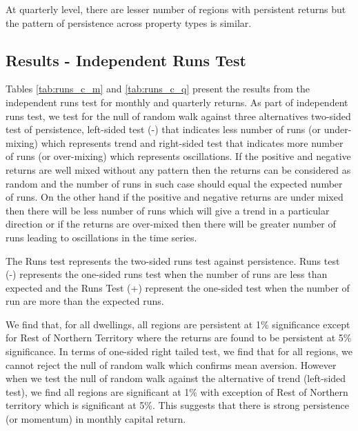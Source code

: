 \documentclass[AEJ,reqno, draftmode]{AEA}
\begin{document}
At quarterly level, there are lesser number of regions with persistent returns but the pattern of persistence across property types is similar.


\restoregeometry


\restoregeometry


\subsection{Results - Independent Runs Test}

Tables \ref{tab:runs_c_m} and \ref{tab:runs_c_q} present the results from the independent runs test for monthly and quarterly returns. As part of independent runs test, we test for the null of random walk against three alternatives two-sided test of persistence, left-sided test (-) that indicates less number of runs (or under-mixing) which represents trend and right-sided test that indicates more number of runs (or over-mixing) which represents oscillations. If the positive and negative returns are well mixed without any pattern then the returns can be considered as random and the number of runs in such case should equal the expected number of runs. On the other hand if the positive and negative returns are under mixed then there will be less number of runs which will give a trend in a particular direction or if the returns are over-mixed then there will be greater number of runs leading to oscillations in the time series. 

The Runs test represents the two-sided runs test against persistence. Runs test (-) represents the one-sided runs test when the number of runs are less than expected and the Runs Test (+) represent the one-sided test when the number of run are more than the expected runs.

We find that, for all dwellings, all regions are persistent at 1\% significance except for Rest of Northern Territory where the returns are found to be persistent at 5\% significance. In terms of one-sided right tailed test, we find that for all regions, we cannot reject the null of random walk which confirms mean aversion. However when we test the null of random walk against the alternative of trend (left-sided test), we find all regions are significant at 1\% with exception of Rest of Northern territory which is significant at 5\%. This suggests that there is strong persistence (or momentum) in monthly capital return.
\end{document}
